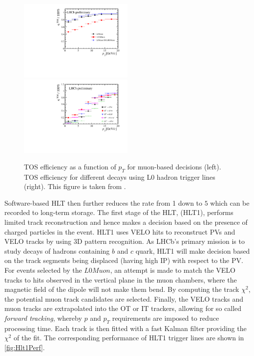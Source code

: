\begin{figure}[!h]
	\centering
	\includegraphics[width = 0.5\textwidth]{figs/detector/Fig1_L0MuonEff_PT.pdf}%
	\includegraphics[width = 0.5\textwidth]{figs/detector/Fig21_L0Hadron_PT.pdf}%
	\caption{ \Gls{TOS} efficiency as a function of $p_{T}$ for muon-based decisions (left).         \Gls{TOS} efficiency for different decays using L0 hadron trigger lines (right). This figure is taken from \cite{Albrecht:2013fba}. }  
	\label{fig:L0Perf}
\end{figure}


Software-based \Gls{HLT} then further reduces the rate from 1 \mhz down to $5$ \khz which can be recorded to long-term storage. The first stage of the \Gls{HLT}, (\Gls{HLT1}), performs limited track reconstruction and hence makes a decision based on the presence of charged particles in the event. \Gls{HLT1} uses \Gls{VELO} hits to reconstruct \Gls{PV}s and \Gls{VELO} tracks by using 3D pattern recognition. As \Gls{LHCb}'s primary mission is to study decays of hadrons containing $b$ and $c$ quark, \Gls{HLT1} will make decision based on the track segments being displaced (having high \Gls{IP}) with respect to the \Gls{PV}. For events selected by the $L0Muon$, an attempt is made to match the \Gls{VELO} tracks to hits observed in the vertical plane in the muon chambers, where the magnetic field of the dipole will not make them bend. By computing the track $\chi^2$, the potential muon track candidates are selected. Finally, the \Gls{VELO} tracks and muon tracks are extrapolated into the \Gls{OT} or \Gls{IT} trackers, allowing for so called \textit{forward tracking}, whereby $p$ and $p_{T}$ requirements are imposed to reduce processing time. Each track is then fitted with  a fast Kalman filter providing the $\chi^2$ of the fit. The corresponding performance of \Gls{HLT1} trigger lines are shown in \autoref{fig:Hlt1Perf}.


